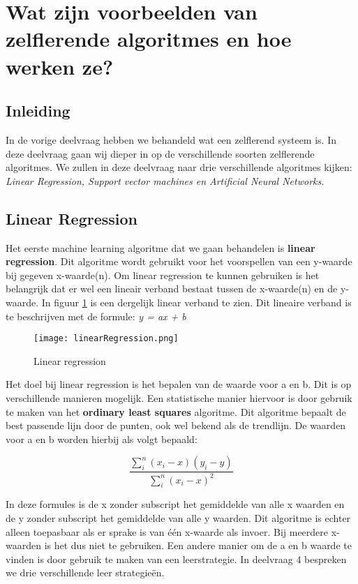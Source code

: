 \section{Wat zijn voorbeelden van zelflerende algoritmes en hoe werken ze?}

\subsection{Inleiding}
In de vorige deelvraag hebben we behandeld wat een zelflerend systeem is. In deze deelvraag gaan wij dieper in op de verschillende soorten zelflerende algoritmes. We zullen in deze deelvraag naar drie verschillende algoritmes kijken: \textit{Linear Regression, Support vector machines en Artificial Neural Networks.} \cite{SunilRay}

\subsection{Linear Regression}
Het eerste machine learning algoritme dat we gaan behandelen is \textbf{linear regression}. Dit algoritme wordt gebruikt voor het voorspellen van een y-waarde bij gegeven x-waarde(n). Om linear regression te kunnen gebruiken is het belangrijk dat er wel een lineair verband bestaat tussen de x-waarde(n) en de y-waarde. In figuur \ref{fig:LinearRegression1} is een dergelijk linear verband te zien. 
Dit lineaire verband is te beschrijven met de formule:
\textit{y = ax + b}

\begin{figure}[h]
  \centering
    \texttt{[image: linearRegression.png]}
  \caption{Linear regression}
  \label{fig:LinearRegression1}
\end{figure}

Het doel bij linear regression is het bepalen van de waarde voor a en b. Dit is op verschillende manieren mogelijk. Een statistische manier hiervoor is door gebruik te maken van het \textbf{ordinary least squares} algoritme. Dit algoritme bepaalt de best passende lijn door de punten, ook wel bekend als de trendlijn. De waarden voor a en b worden hierbij als volgt bepaald:

\[
	\frac{\sum_i^n(x_{i} - x)(y_{i} - y)}{\sum_i^n(x_{i} - x)^{2}}
\]

In deze formules is de x zonder subscript het gemiddelde van alle x waarden en de y zonder subscript het gemiddelde van alle y waarden. 
Dit algoritme is echter alleen toepasbaar als er sprake is van één x-waarde als invoer. Bij meerdere x-waarden is het dus niet te gebruiken. Een andere manier om de a en b waarde te vinden is door gebruik te maken van een leerstrategie. In deelvraag 4 bespreken we drie verschillende leer strategieën.


